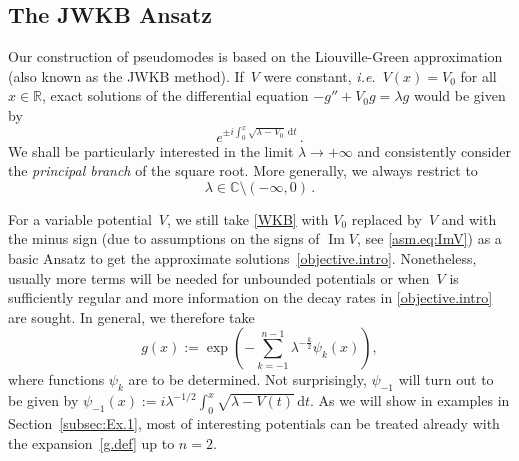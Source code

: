 \subsection{The JWKB Ansatz}
Our construction of pseudomodes
is based on the Liouville-Green approximation 
(also known as the JWKB method).
If~$V$ were constant, {\emph{i.e.}}\ $V(x) = V_0$ for all $x \in {\mathbb{R}}$,
exact solutions of the differential equation
$-g''+V_0 g = \lambda g$ would be given by 
\begin{equation}\label{WKB}
e^{\pm i\int_0^x \sqrt{\lambda-V_0} \, {\mathrm{d}} t}
\,.
\end{equation}
We shall be particularly interested in the limit $\lambda \to + \infty$
and consistently consider the \emph{principal branch} of the square root.
More generally, we always restrict to 
\begin{equation}\label{contour}
  \lambda \in {\mathbb{C}}\setminus (-\infty,0)
  \,.
\end{equation}

 
For a variable potential~$V$, we still take \eqref{WKB} with $V_0$ replaced by~$V$ and with the minus sign (due to assumptions on the signs of ${\operatorname{Im}} V$, see \eqref{asm.eq:ImV}) as a basic Ansatz to get the approximate solutions~\eqref{objective.intro}. Nonetheless, usually more terms will be needed for unbounded potentials or when~$V$ is sufficiently regular 
and more information on the decay rates in \eqref{objective.intro} 
are sought. 
In general, we therefore take
\begin{equation}\label{g.def}
g(x) := \exp \left(- \sum_{k=-1}^{n-1} \lambda^{-\frac k2} \psi_k(x) \right),
\end{equation}
where functions $\psi_k$ are to be determined. Not surprisingly, $\psi_{-1}$ will turn out to be given by
$\psi_{-1}(x) := i \lambda^{-1/2}\int_0^x \sqrt{\lambda -V(t)} \, {\mathrm{d}} t$. As we will show in examples  in Section~\ref{subsec:Ex.1}, 
most of interesting potentials 
can be treated already with the expansion~\eqref{g.def} up to $n=2$.

